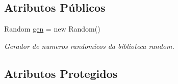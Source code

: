 \subsection*{Atributos Públicos}
\begin{DoxyCompactItemize}
\item 
\mbox{\label{class_veiculo_a98ea80a955045a5f578f25fff5b4999a}} 
Random \mbox{\hyperlink{class_veiculo_a98ea80a955045a5f578f25fff5b4999a}{gen}} = new Random()
\begin{DoxyCompactList}\small\item\em Gerador de numeros randomicos da biblioteca random. \end{DoxyCompactList}\end{DoxyCompactItemize}
\subsection*{Atributos Protegidos}
